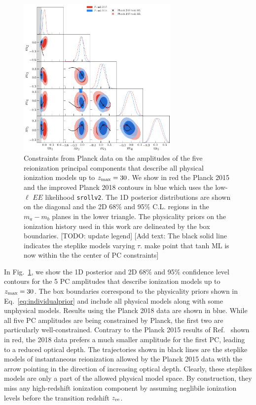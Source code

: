 \documentclass[prd,twocolumn,amsmath,amssymb,floatfix,superscriptaddress,nofootinbib]{revtex4-1}
\newcommand{\zmax}{z_{\rm max}}
\begin{document}
\begin{figure}
\includegraphics[width=0.7\textwidth]{plots/plot_mj_triangle_t18_r12_t19_t20_vs_pl18_pc_zmax30_pliklite_srollv2_1015_wTauTrajectory_pl15_wTanhML.png}
\caption{Constraints from Planck data on the amplitudes of the five reionization principal components that describe all physical ionization models up to $z_{\rm max} = 30$. We show in red the Planck 2015 and the improved Planck 2018 contours in blue which uses the low-$\ell$ $EE$ likelihood \texttt{srollv2}. The 1D posterior distributions are shown on the diagonal and the 2D 68\% and 95\% C.L. regions in the $m_a-m_b$ planes in the lower triangle. The physicality priors on the ionization history used in this work are delineated by the box boundaries. [TODO: update legend] [Add text: The black solid line indicates the steplike models varying $\tau$. make point that tanh ML is now within the the center of PC constraints]}
\label{fig:plot_mjs_2018_vs_2015}
\end{figure}
%
In Fig.~\ref{fig:plot_mjs_2018_vs_2015}, we show the 1D posterior and 2D 68\% and 95\% confidence level contours for the 5 PC amplitudes that describe ionization models up to $\zmax=30$. The box boundaries correspond to the physicality priors shown in Eq.~\ref{eq:individualprior} and include all physical models along with some unphysical models. Results using the Planck 2018 data are shown in blue. While all five PC amplitudes are being constrained by Planck, the first two are particularly well-constrained. Contrary to the Planck 2015 results of Ref.~\cite{Heinrich:2016ojb} shown in red, the 2018 data prefers a much smaller amplitude for the first PC, leading to a reduced optical depth.
The trajectories shown in black lines are the steplike models of instantaneous reionization allowed by the Planck 2015 data with the arrow pointing in the direction of increasing optical depth. Clearly, these steplikes models are only a part of the allowed physical model space. By construction, they miss any high-redshift ionization component by assuming neglibile ionization levels before the transition redshift $z_{\rm re}$. 
\end{document}
